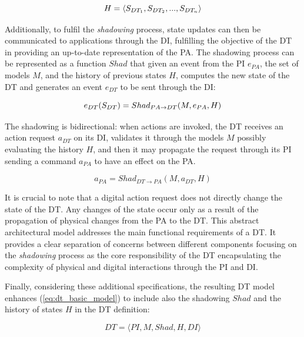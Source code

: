 \begin{equation}\label{eq:dt_history}
        H = \langle S_{DT_1}, S_{DT_2}, ... , S_{DT_n}\rangle\\
\end{equation}

Additionally, to fulfil the \emph{shadowing} process, 
state updates can then be communicated to applications through the \ac{DI}, fulfilling the objective of the \ac{DT} in providing an up-to-date representation of the \ac{PA}.
%
The shadowing process can be represented as a function $Shad$ that given an event from the \ac{PI} $e_{PA}$, the set of models $M$, and the history of previous states $H$, computes the new state of the \ac{DT} and generates an event $e_{DT}$ to be sent through the \ac{DI}:

\begin{equation}
        e_{DT}(S_{DT}) = Shad_{PA \rightarrow DT}(M, e_{PA}, H) \\
\end{equation}

The shadowing is bidirectional:
when actions are invoked, the \ac{DT} receives an action request $a_{DT}$ on its \ac{DI}, validates it through the models $M$ possibly evaluating the history $H$, and then it may propagate the request through its \ac{PI} sending a command $a_{PA}$ to have an effect on the \ac{PA}.

\begin{equation}
    a_{PA} = Shad_{DT \rightarrow PA}(M, a_{DT}, H)
\end{equation}

It is crucial to note that a digital action request does not directly change the state of the \ac{DT}.
Any changes of the state occur only as a result of the propagation of physical changes from the \ac{PA} to the \ac{DT}.
This abstract architectural model addresses the main functional requirements of a \ac{DT}.
It provides a clear separation of concerns between different components focusing on the \emph{shadowing} process as the core responsibility of the \ac{DT} encapsulating the complexity of physical and digital interactions through the \ac{PI} and \ac{DI}. 


Finally, considering these additional specifications, the resulting \ac{DT} model enhances (\ref{eq:dt_basic_model}) to include also the shadowing $Shad$ and the history of states $H$ in the \ac{DT} definition:

\begin{equation}\label{eq:5D_dt_model}
    DT = \langle PI, M, Shad, H, DI \rangle
\end{equation}


